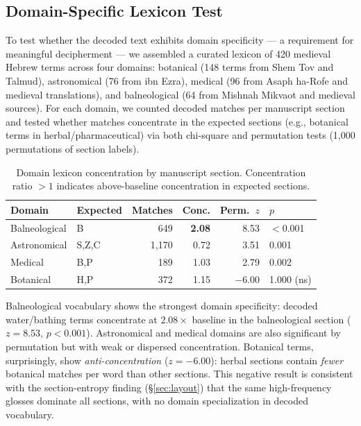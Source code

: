 \documentclass[11pt,a4paper]{article}
\begin{document}
\subsection{Domain-Specific Lexicon Test}
\label{sec:domain-lexicon}

To test whether the decoded text exhibits domain specificity --- a requirement
for meaningful decipherment --- we assembled a curated lexicon of 420 medieval
Hebrew terms across four domains: botanical (148 terms from Shem Tov and Talmud),
astronomical (76 from ibn Ezra), medical (96 from Asaph ha-Rofe and medieval
translations), and balneological (64 from Mishnah Mikvaot and medieval sources).
For each domain, we counted decoded matches per manuscript section and tested
whether matches concentrate in the expected sections (e.g., botanical terms
in herbal/pharmaceutical) via both chi-square and permutation tests
(1,000 permutations of section labels).

\begin{table}[htbp]
\centering
\caption{Domain lexicon concentration by manuscript section. Concentration
ratio $>1$ indicates above-baseline concentration in expected sections.}
\label{tab:domain}
\small
\begin{tabular}{@{}llrrrl@{}}
\toprule
Domain & Expected & Matches & Conc. & Perm.\ $z$ & $p$ \\
\midrule
Balneological & B & 649 & \textbf{2.08} & 8.53 & $<$0.001 \\
Astronomical & S,Z,C & 1,170 & 0.72 & 3.51 & 0.001 \\
Medical & B,P & 189 & 1.03 & 2.79 & 0.002 \\
Botanical & H,P & 372 & 1.15 & $-6.00$ & 1.000 (ns) \\
\bottomrule
\end{tabular}
\end{table}

Balneological vocabulary shows the strongest domain specificity:
decoded water/bathing terms concentrate at $2.08\times$ baseline in the
balneological section ($z=8.53$, $p<0.001$). Astronomical and medical
domains are also significant by permutation but with weak or dispersed
concentration. Botanical terms, surprisingly, show \emph{anti-concentration}
($z=-6.00$): herbal sections contain \emph{fewer} botanical matches per
word than other sections. This negative result is consistent with the
section-entropy finding (\S\ref{sec:layout}) that the same high-frequency
glosses dominate all sections, with no domain specialization in decoded
vocabulary.
\end{document}
